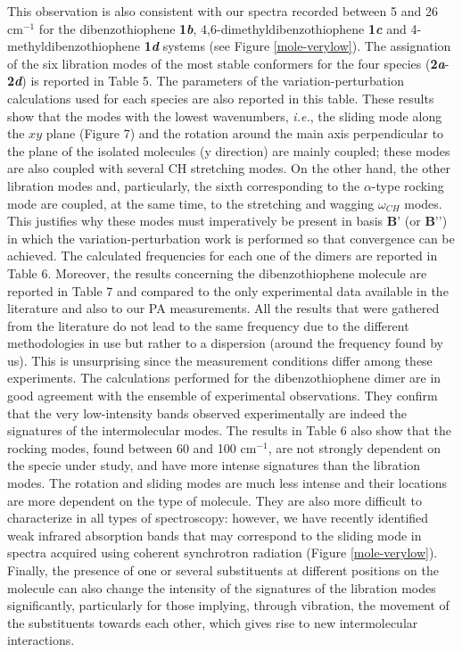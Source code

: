 		
		This observation is also consistent with our spectra recorded between 5 and 26 cm$^{-1}$ for the dibenzothiophene \textbf{1\textit{b}},  4,6-dimethyldibenzothiophene \textbf{1\textit{c}} and 4-methyldibenzothiophene \textbf{1\textit{d}} systems (see Figure \ref{mole-verylow}). The assignation of the six libration modes of the most stable conformers for the four species (\textbf{2\textit{a}}-\textbf{2\textit{d}}) is reported in Table 5. The parameters of the variation-perturbation calculations used for each species are also reported in this table. These results show that the modes with the lowest wavenumbers, \textit{i.e.}, the sliding mode along the $xy$ plane (Figure 7) and the rotation around the main axis perpendicular to the plane of the isolated molecules (y direction) are mainly coupled; these modes are also coupled with several CH stretching modes. On the other hand, the other libration modes and, particularly, the sixth corresponding to the $\alpha$-type rocking mode are coupled, at the same time, to the stretching and wagging $\omega_{CH}$ modes. This justifies why these modes must imperatively be present in basis $\textbf{B’}$ (or $\textbf{B’’}$) in which the variation-perturbation work is performed so that convergence can be achieved. The calculated frequencies for each one of the dimers are reported in Table 6. Moreover, the results concerning the dibenzothiophene molecule are reported in Table 7 and compared to the only experimental data available in the literature and also to our PA measurements. All the results that were gathered from the literature do not lead to the same frequency due to the different methodologies in use but rather to a dispersion (around the frequency found by us). This is unsurprising since the measurement conditions differ among these experiments. The calculations performed for the dibenzothiophene dimer are in good agreement with the ensemble of experimental observations. They confirm that the very low-intensity bands observed experimentally are indeed the signatures of the intermolecular modes. The results in Table 6 also show that the rocking modes, found between 60 and 100 cm$^{-1}$, are not strongly dependent on the specie under study, and have more intense signatures than the libration modes. The rotation and sliding modes are much less intense and their locations are more dependent on the type of molecule. They are also more difficult to characterize in all types of spectroscopy: however, we have recently identified weak infrared absorption bands that may correspond to the sliding mode in spectra acquired using coherent synchrotron radiation (Figure \ref{mole-verylow}). Finally, the presence of one or several substituents at different positions on the molecule can also change the intensity of the signatures of the libration modes significantly, particularly for those implying, through vibration, the movement of the substituents towards each other, which gives rise to new intermolecular interactions.\\
		
